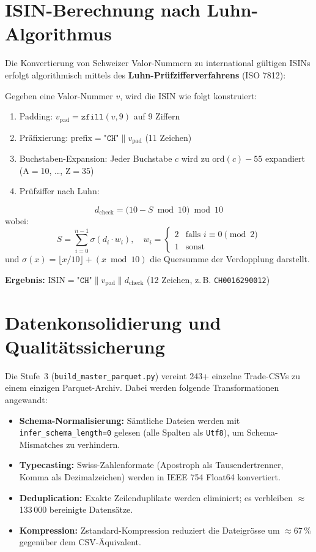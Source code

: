 \documentclass[12pt, a4paper, oneside]{report}
\newcommand{\code}[1]{\texttt{\small\textcolor{darknavy}{#1}}}
\begin{document}
\section{ISIN-Berechnung nach Luhn-Algorithmus}

Die Konvertierung von Schweizer Valor-Nummern zu international gültigen ISINs erfolgt algorithmisch mittels des \textbf{Luhn-Prüfzifferverfahrens} (ISO 7812):

\begin{mathbox}
Gegeben eine Valor-Nummer $v$, wird die ISIN wie folgt konstruiert:
\begin{enumerate}
  \item Padding: $v_{\text{pad}} = \texttt{zfill}(v, 9)$ auf 9 Ziffern
  \item Präfixierung: $\text{prefix} = \texttt{"CH"} \| v_{\text{pad}}$ (11 Zeichen)
  \item Buchstaben-Expansion: Jeder Buchstabe $c$ wird zu $\text{ord}(c) - 55$ expandiert (A$=$10, \ldots, Z$=$35)
  \item Prüfziffer nach Luhn:
\end{enumerate}
\[
  d_{\text{check}} = \bigl(10 - S \bmod 10\bigr) \bmod 10
\]
wobei:
\[
  S = \sum_{i=0}^{n-1} \sigma\!\left(d_i \cdot w_i\right), \quad w_i = \begin{cases} 2 & \text{falls } i \equiv 0 \pmod{2} \\ 1 & \text{sonst} \end{cases}
\]
und $\sigma(x) = \lfloor x/10 \rfloor + (x \bmod 10)$ die Quersumme der Verdopplung darstellt.

\textbf{Ergebnis:} $\text{ISIN} = \texttt{"CH"} \| v_{\text{pad}} \| d_{\text{check}}$ (12 Zeichen, z.\,B. \texttt{CH0016290012})
\end{mathbox}

\section{Datenkonsolidierung und Qualitätssicherung}

Die Stufe~3 (\code{build\_master\_parquet.py}) vereint 243+ einzelne Trade-CSVs zu einem einzigen Parquet-Archiv. Dabei werden folgende Transformationen angewandt:

\begin{itemize}
  \item \textbf{Schema-Normalisierung:} Sämtliche Dateien werden mit \code{infer\_schema\_length=0} gelesen (alle Spalten als \code{Utf8}), um Schema-Mismatches zu verhindern.
  \item \textbf{Typecasting:} Swiss-Zahlenformate (Apostroph als Tausendertrenner, Komma als Dezimalzeichen) werden in IEEE 754 Float64 konvertiert.
  \item \textbf{Deduplication:} Exakte Zeilenduplikate werden eliminiert; es verbleiben $\approx$133\,000 bereinigte Datensätze.
  \item \textbf{Kompression:} Zstandard-Kompression reduziert die Dateigrösse um $\approx$67\,\% gegenüber dem CSV-Äquivalent.
\end{itemize}
\end{document}
